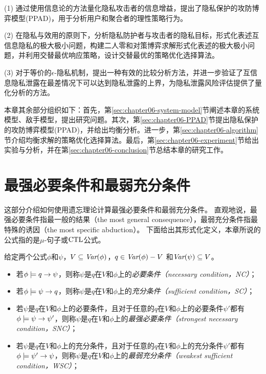 (1) 通过使用信息论的方法量化隐私攻击者的信息增益，提出了隐私保护的攻防博弈模型(PPAD)，用于分析用户和聚合者的理性策略行为。
	
(2) 在隐私与效用的原则下，分析隐私防护者与攻击者的隐私目标，形式化表述互信息隐私的极大极小问题，构建二人零和对策博弈求解形式化表述的极大极小问题，并利用交替最优响应策略，设计交替最优的策略优化选择算法。
	
(3) 对于等价的$\epsilon$-隐私机制，提出一种有效的比较分析方法，并进一步验证了互信息隐私泄露在最差情况下可以达到隐私泄露的上界，为隐私泄露风险评估提供了量化分析的方法。


本章其余部分组织如下：首先，第\ref{sec:chapter06-system-model}节阐述本章的系统模型、敌手模型，提出研究问题。其次，第\ref{sec:chapter06-PPAD}节提出隐私保护的攻防博弈模型(PPAD)，并给出均衡分析。进一步，第\ref{sec:chapter06-algorithm}节介绍均衡求解的策略优化选择算法。最后，第\ref{sec:chapter06-experiment}节给出实验与分析，并在第\ref{sec:chapter06-conclusion}节总结本章的研究工作。

\section{最强必要条件和最弱充分条件}\label{sec:chapter07-snc-wsc}
这部分介绍如何使用遗忘理论计算最强必要条件和最弱充分条件。
直观地说，最强必要条件指最一般的结果（the most general consequence），最弱充分条件指最特殊的诱因（the most specific abduction）。
下面给出其形式化定义，本章所说的公式指的是$\mu$-句子或$\textrm{CTL}$公式。
\begin{definition}[充分和必要条件]\label{def:NC:SC}
	给定两个公式$\phi$和$\psi$，$V \subseteq \textit{Var}(\phi)$，$q\in\textit{Var}(\phi)- V$
	和$\textit{Var}(\psi)\subseteq V$。
	\begin{itemize}
		\item 若$\phi \models q \rightarrow \psi$，则称$\psi$是$q$在$V$和$\phi$上的{\em 必要条件（necessary condition，NC）}；
		\item 若$\phi \models \psi\rightarrow q$，则称$\psi$是$q$在$V$和$\phi$上的{\em 充分条件（sufficient condition，SC）}；
		\item 若$\psi$是$q$在$V$和$\phi$上的必要条件，且对于任意的$q$在$V$和$\phi$上的必要条件$\psi'$都有$\phi\models\psi\rightarrow\psi'$，则称$\psi$是$q$在$V$和$\phi$上的{\em 最强必要条件（strongest necessary condition，SNC）}；
		\item 若$\psi$是$q$在$V$和$\phi$上的充分条件，且对于任意的$q$在$V$和$\phi$上的充分条件$\psi'$都有$\phi\models\psi'\rightarrow\psi$，则称$\psi$是$q$在$V$和$\phi$上的{\em 最弱充分条件（weakest sufficient condition，WSC）}；
	\end{itemize}
\end{definition}

